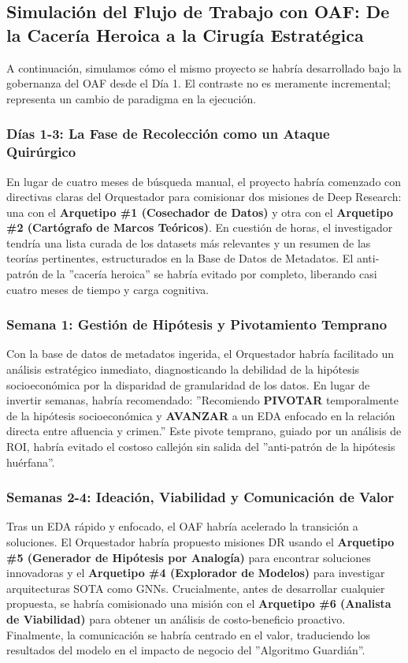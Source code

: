\documentclass[11pt, a4paper]{article}
\begin{document}
\subsection{Simulación del Flujo de Trabajo con OAF: De la Cacería Heroica a la Cirugía Estratégica}
\label{subsec:flujo_oaf}

A continuación, simulamos cómo el mismo proyecto se habría desarrollado bajo la gobernanza del OAF desde el Día 1. El contraste no es meramente incremental; representa un cambio de paradigma en la ejecución.

\subsubsection*{Días 1-3: La Fase de Recolección como un Ataque Quirúrgico}
En lugar de cuatro meses de búsqueda manual, el proyecto habría comenzado con directivas claras del Orquestador para comisionar dos misiones de Deep Research: una con el \textbf{Arquetipo \#1 (Cosechador de Datos)} y otra con el \textbf{Arquetipo \#2 (Cartógrafo de Marcos Teóricos)}. En cuestión de horas, el investigador tendría una lista curada de los datasets más relevantes y un resumen de las teorías pertinentes, estructurados en la Base de Datos de Metadatos. El anti-patrón de la ''cacería heroica'' se habría evitado por completo, liberando casi cuatro meses de tiempo y carga cognitiva.

\subsubsection*{Semana 1: Gestión de Hipótesis y Pivotamiento Temprano}
Con la base de datos de metadatos ingerida, el Orquestador habría facilitado un análisis estratégico inmediato, diagnosticando la debilidad de la hipótesis socioeconómica por la disparidad de granularidad de los datos. En lugar de invertir semanas, habría recomendado: ''Recomiendo \textbf{PIVOTAR} temporalmente de la hipótesis socioeconómica y \textbf{AVANZAR} a un EDA enfocado en la relación directa entre afluencia y crimen.'' Este pivote temprano, guiado por un análisis de ROI, habría evitado el costoso callejón sin salida del ''anti-patrón de la hipótesis huérfana''.

\subsubsection*{Semanas 2-4: Ideación, Viabilidad y Comunicación de Valor}
Tras un EDA rápido y enfocado, el OAF habría acelerado la transición a soluciones. El Orquestador habría propuesto misiones DR usando el \textbf{Arquetipo \#5 (Generador de Hipótesis por Analogía)} para encontrar soluciones innovadoras y el \textbf{Arquetipo \#4 (Explorador de Modelos)} para investigar arquitecturas SOTA como GNNs. Crucialmente, antes de desarrollar cualquier propuesta, se habría comisionado una misión con el \textbf{Arquetipo \#6 (Analista de Viabilidad)} para obtener un análisis de costo-beneficio proactivo. Finalmente, la comunicación se habría centrado en el valor, traduciendo los resultados del modelo en el impacto de negocio del ''Algoritmo Guardián''.
\end{document}
